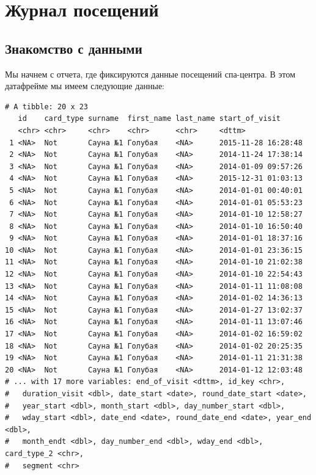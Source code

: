 \documentclass[
  letterpaper,
  DIV=11,
  numbers=noendperiod]{scrreprt}
\begin{document}

\hypertarget{ux436ux443ux440ux43dux430ux43b-ux43fux43eux441ux435ux449ux435ux43dux438ux439}{%
\chapter{Журнал
посещений}\label{ux436ux443ux440ux43dux430ux43b-ux43fux43eux441ux435ux449ux435ux43dux438ux439}}

\hypertarget{ux437ux43dux430ux43aux43eux43cux441ux442ux432ux43e-ux441-ux434ux430ux43dux43dux44bux43cux438}{%
\section{Знакомство с
данными}\label{ux437ux43dux430ux43aux43eux43cux441ux442ux432ux43e-ux441-ux434ux430ux43dux43dux44bux43cux438}}

Мы начнем с отчета, где фиксируются данные посещений спа-центра. В этом
датафрейме мы имеем следующие данные:

\begin{verbatim}
# A tibble: 20 x 23
   id    сard_type surname  first_name last_name start_of_visit     
   <chr> <chr>     <chr>    <chr>      <chr>     <dttm>             
 1 <NA>  Not       Сауна №1 Голубая    <NA>      2015-11-28 16:28:48
 2 <NA>  Not       Сауна №1 Голубая    <NA>      2014-11-24 17:38:14
 3 <NA>  Not       Сауна №1 Голубая    <NA>      2014-01-09 09:57:26
 4 <NA>  Not       Сауна №1 Голубая    <NA>      2015-12-31 01:03:13
 5 <NA>  Not       Сауна №1 Голубая    <NA>      2014-01-01 00:40:01
 6 <NA>  Not       Сауна №1 Голубая    <NA>      2014-01-01 05:53:23
 7 <NA>  Not       Сауна №1 Голубая    <NA>      2014-01-10 12:58:27
 8 <NA>  Not       Сауна №1 Голубая    <NA>      2014-01-10 16:50:40
 9 <NA>  Not       Сауна №1 Голубая    <NA>      2014-01-01 18:37:16
10 <NA>  Not       Сауна №1 Голубая    <NA>      2014-01-01 23:36:15
11 <NA>  Not       Сауна №1 Голубая    <NA>      2014-01-10 21:02:38
12 <NA>  Not       Сауна №1 Голубая    <NA>      2014-01-10 22:54:43
13 <NA>  Not       Сауна №1 Голубая    <NA>      2014-01-11 11:08:08
14 <NA>  Not       Сауна №1 Голубая    <NA>      2014-01-02 14:36:13
15 <NA>  Not       Сауна №1 Голубая    <NA>      2014-01-27 13:02:37
16 <NA>  Not       Сауна №1 Голубая    <NA>      2014-01-11 13:07:46
17 <NA>  Not       Сауна №1 Голубая    <NA>      2014-01-02 16:59:02
18 <NA>  Not       Сауна №1 Голубая    <NA>      2014-01-02 20:25:35
19 <NA>  Not       Сауна №1 Голубая    <NA>      2014-01-11 21:31:38
20 <NA>  Not       Сауна №1 Голубая    <NA>      2014-01-12 12:03:48
# ... with 17 more variables: end_of_visit <dttm>, id_key <chr>,
#   duration_visit <dbl>, date_start <date>, round_date_start <date>,
#   year_start <dbl>, month_start <dbl>, day_number_start <dbl>,
#   wday_start <dbl>, date_end <date>, round_date_end <date>, year_end <dbl>,
#   month_endt <dbl>, day_number_end <dbl>, wday_end <dbl>, сard_type_2 <chr>,
#   segment <chr>
\end{verbatim}
\end{document}
